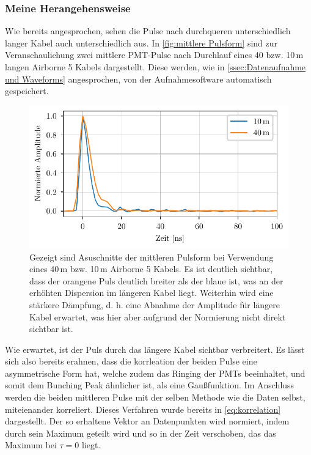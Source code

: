 \subsubsection{Meine Herangehensweise}
\label{sssec:Fitfunktion - Meine Herangehensweise}
Wie bereits angesprochen, sehen die Pulse nach durchqueren unterschiedlich langer Kabel auch unterschiedlich aus. 
In \autoref{fig:mittlere Pulsform} sind zur Veranschaulichung zwei mittlere PMT-Pulse nach Durchlauf eines 40 bzw. 10\,m langen Airborne 5 Kabels dargestellt. 
Diese werden, wie in \autoref{ssec:Datenaufnahme und Waveforms} angesprochen, von der Aufnahmesoftware automatisch gespeichert. 
\begin{figure}[h]
    \centering
    \includegraphics{images/Analysis/mean_pulseshapes.pdf}
    \caption{Gezeigt sind Asuschnitte der mittleren Pulsform bei Verwendung eines 40\,m bzw. 10\,m Airborne 5 Kabels. Es ist deutlich sichtbar, dass der orangene Puls deutlich breiter als der blaue ist, was an der erhöhten Dispersion im längeren Kabel liegt. Weiterhin wird eine stärkere Dämpfung, d. h. eine Abnahme der Amplitude für längere Kabel erwartet, was hier aber aufgrund der Normierung nicht direkt sichtbar ist.}
    \label{fig:mittlere Pulsform}
\end{figure}
Wie erwartet, ist der Puls durch das längere Kabel sichtbar verbreitert. 
Es lässt sich also bereits erahnen, dass die korrleation der beiden Pulse eine asymmetrische Form hat, welche zudem das Ringing der PMTs beeinhaltet, und somit dem Bunching Peak ähnlicher ist, als eine Gaußfunktion. 
Im Anschluss werden die beiden mittleren Pulse mit der selben Methode wie die Daten selbst, miteienander korreliert. 
Dieses Verfahren wurde bereits in \autoref{eq:korrelation} dargestellt. 
Der so erhaltene Vektor an Datenpunkten wird normiert, indem durch sein Maximum geteilt wird und so in der Zeit verschoben, das das Maximum bei $\tau=0$ liegt. 
